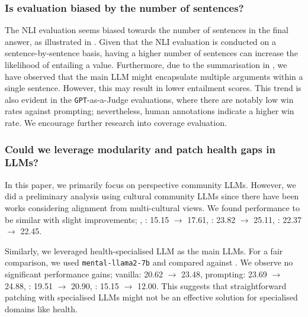 \subsubsection*{Is \overton evaluation biased by the number of sentences?}
    
The NLI evaluation seems biased towards the number of sentences in the final answer, as illustrated in . Given that the NLI evaluation is conducted on a sentence-by-sentence basis, having a higher number of sentences can increase the likelihood of entailing a value. Furthermore, due to the summarisation in \modplural, we have observed that the main LLM might encapsulate multiple arguments within a single sentence. However, this may result in lower entailment scores. This trend is also evident in the \texttt{GPT}-as-a-Judge evaluations, where there are notably low win rates against prompting; nevertheless, human annotations indicate a higher win rate. We encourage further research into \overton coverage evaluation.


\subsubsection*{Could we leverage modularity and patch health gaps in LLMs?}
In this paper, we primarily focus on perspective community LLMs. However, we did a preliminary analysis using cultural community LLMs since there have been works considering alignment from multi-cultural views. We found performance to be similar with slight improvements; \modplural, \llamaSeven: 15.15 $\rightarrow$ 17.61, \llamaEight: 23.82 $\rightarrow$ 25.11, \gemmaSeven: 22.37 $\rightarrow$ 22.45. 

Similarly, we leveraged health-specialised LLM \citep{yang_mentallama_2024,kim_health-llm_2024} as the main LLMs. 
For a fair comparison, we used \texttt{mental-llama2-7b} and compared against \llamaSeven. We observe no significant performance gains; vanilla: 20.62 $\rightarrow$ 23.48, prompting: 23.69 $\rightarrow$ 24.88, \moe: 19.51 $\rightarrow$ 20.90, \modplural: 15.15 $\rightarrow$ 12.00. This suggests that straightforward patching with specialised LLMs might not be an effective solution for specialised domains like health.


